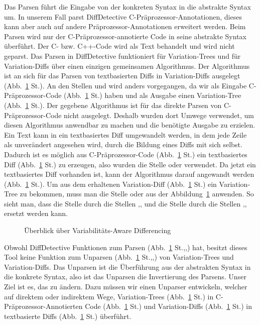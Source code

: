 Das Parsen führt die Eingabe von der konkreten Syntax in die abstrakte Syntax um. In unserem Fall parst DiffDetective  C-Präprozessor-Annotationen, dieses kann aber auch auf andere Präprozessor-Annotationen erweitert werden. Beim Parsen wird nur der C-Präprozessor-annotierte Code in seine abstrakte Syntax überführt. Der C- bzw. C++-Code wird als Text behandelt und wird nicht geparst. Das Parsen in DiffDetective funktioniert für Variation-Trees und für Variation-Diffs über einen einzigen gemeinsamen Algorithmus. Der Algorithmus ist an sich für das Parsen von textbasierten Diffs in Variation-Diffs ausgelegt (Abb.~\ref{fig:1} St.). An den Stellen  und  wird anders vorgegangen, da wir als Eingabe C-Präprozessor-Code (Abb.~\ref{fig:1} St.) haben und als Ausgabe einen Variation-Tree (Abb.~\ref{fig:1} St.). Der gegebene Algorithmus ist für das direkte Parsen von C-Präprozessor-Code nicht ausgelegt. Deshalb wurden dort Umwege verwendet, um diesen Algorithmus anwendbar zu machen und die benötigte Ausgabe zu erzielen.  Ein Text kann in ein textbasiertes Diff umgewandelt werden, in dem jede Zeile als unverändert angesehen wird, durch die Bildung eines Diffs mit sich selbst. Dadurch ist es möglich aus C-Präprozessor-Code (Abb.~\ref{fig:1} St.) ein textbasiertes Diff (Abb.~\ref{fig:1} St.) zu erzeugen, also wurden die Stelle  oder  verwendet. Da jetzt ein textbasiertes Diff vorhanden ist, kann der Algorithmus darauf angewandt werden (Abb.~\ref{fig:1} St.). Um aus dem erhaltenen Variation-Diff (Abb.~\ref{fig:1} St.) ein Variation-Tree zu bekommen, muss man die Stelle  oder  aus der Abbildung~\ref{fig:1} anwenden. So sieht man, dass die Stelle  durch die Stellen ,, und die Stelle  durch die Stellen ,, ersetzt werden kann.



\begin{figure}[H]
	\centering
	\vaShow
	\caption{Überblick über Variabilitäts-Aware Differencing~\cite{BSM+:FSE24Companion}}
	\label{fig:1}
\end{figure}


Obwohl DiffDetective Funktionen zum Parsen (Abb.~\ref{fig:1} St.,,) hat, besitzt dieses Tool keine Funktion zum Unparsen (Abb.~\ref{fig:1} St.,,) von Variation-Trees und Variation-Diffs. Das Unparsen ist die Überführung aus der abstrakten Syntax in die konkrete Syntax, also ist das Unparsen die Invertierung des Parsens. Unser Ziel ist es, das zu ändern. Dazu müssen wir einen Unparser entwickeln, welcher auf direktem oder indirektem Wege, Variation-Trees (Abb.~\ref{fig:1} St.) in C-Präprozessor-Annotierten Code (Abb.~\ref{fig:1} St.) und Variation-Diffs (Abb.~\ref{fig:1} St.) in textbasierte Diffs (Abb.~\ref{fig:1} St.) überführt.\\

